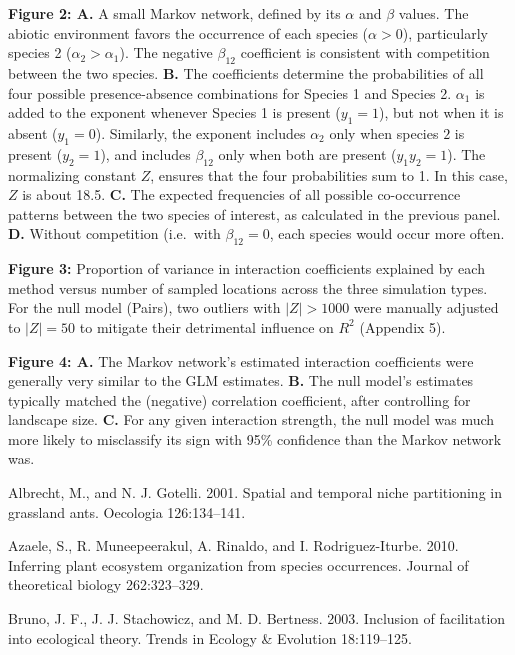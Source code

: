 \documentclass[12pt,]{article}
\begin{document}
\begin{spacing}{1.9}
\begin{flushleft}
\textbf{Figure 2: A.} A small Markov network, defined by its \(\alpha\)
and \(\beta\) values. The abiotic environment favors the occurrence of
each species (\(\alpha >0\)), particularly species 2
(\(\alpha_2 > \alpha_1\)). The negative \(\beta_{12}\) coefficient is
consistent with competition between the two species. \textbf{B.} The
coefficients determine the probabilities of all four possible
presence-absence combinations for Species 1 and Species 2. \(\alpha_1\)
is added to the exponent whenever Species 1 is present (\(y_1 = 1\)),
but not when it is absent (\(y_1 = 0\)). Similarly, the exponent
includes \(\alpha_2\) only when species \(2\) is present (\(y_2 = 1\)),
and includes \(\beta_{12}\) only when both are present (\(y_1y_2 = 1\)).
The normalizing constant \(Z\), ensures that the four probabilities sum
to 1. In this case, \(Z\) is about 18.5. \textbf{C.} The expected
frequencies of all possible co-occurrence patterns between the two
species of interest, as calculated in the previous panel. \textbf{D.}
Without competition (i.e.~with \(\beta_{12}=0\), each species would
occur more often.

\textbf{Figure 3:} Proportion of variance in interaction coefficients
explained by each method versus number of sampled locations across the
three simulation types. For the null model (Pairs), two outliers with
\(|Z|>1000\) were manually adjusted to \(|Z|=50\) to mitigate their
detrimental influence on \(R^2\) (Appendix 5).

\textbf{Figure 4: A.} The Markov network's estimated interaction
coefficients were generally very similar to the GLM estimates.
\textbf{B.} The null model's estimates typically matched the (negative)
correlation coefficient, after controlling for landscape size.
\textbf{C.} For any given interaction strength, the null model was much
more likely to misclassify its sign with 95\% confidence than the Markov
network was.

Albrecht, M., and N. J. Gotelli. 2001. Spatial and temporal niche
partitioning in grassland ants. Oecologia 126:134--141.

Azaele, S., R. Muneepeerakul, A. Rinaldo, and I. Rodriguez-Iturbe. 2010.
Inferring plant ecosystem organization from species occurrences. Journal
of theoretical biology 262:323--329.

Bruno, J. F., J. J. Stachowicz, and M. D. Bertness. 2003. Inclusion of
facilitation into ecological theory. Trends in Ecology \& Evolution
18:119--125.


\end{flushleft}
\end{spacing}
\end{document}
